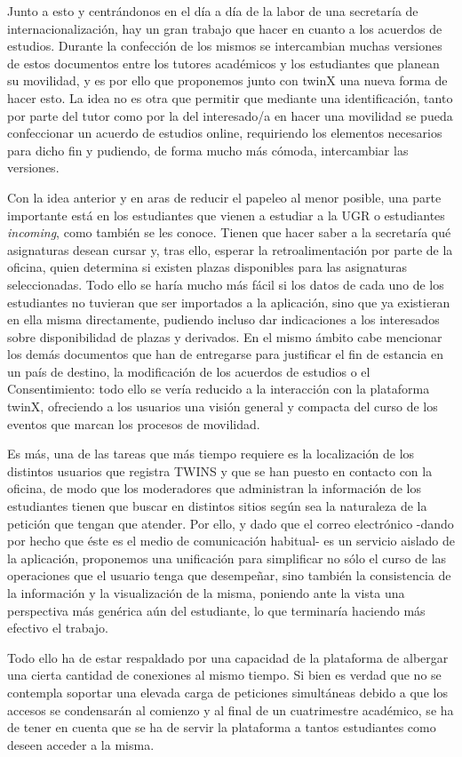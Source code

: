 Junto a esto y centrándonos en el día a día de la labor de una secretaría de internacionalización, hay un gran trabajo que hacer en cuanto a los acuerdos de estudios. Durante la confección de los mismos se intercambian muchas versiones de estos documentos entre los tutores académicos y  los estudiantes que planean su movilidad, y es por ello que proponemos junto con twinX una nueva forma de hacer esto. La idea no es otra que permitir que mediante una identificación, tanto por parte del tutor como por la del interesado/a en hacer una movilidad se pueda confeccionar un acuerdo de estudios online, requiriendo los elementos necesarios para dicho fin y pudiendo, de forma mucho más cómoda, intercambiar las versiones.

Con la idea anterior y en aras de reducir el papeleo al menor posible, una parte importante está en los estudiantes que vienen a estudiar a la UGR o estudiantes \textit{incoming}, como también se les conoce. Tienen que hacer saber a la secretaría qué asignaturas desean cursar y, tras ello, esperar la retroalimentación por parte de la oficina, quien determina si existen plazas disponibles para las asignaturas seleccionadas. Todo ello se haría mucho más fácil si los datos de cada uno de los estudiantes no tuvieran que ser importados a la aplicación, sino que ya existieran en ella misma directamente, pudiendo incluso dar indicaciones a los interesados sobre disponibilidad de plazas y derivados. En el mismo ámbito cabe mencionar los demás documentos que han de entregarse para justificar el fin de estancia en un país de destino, la modificación de los acuerdos de estudios o el \gls{Consentimiento}: todo ello se vería reducido a la interacción con la plataforma twinX, ofreciendo a los usuarios una visión general y compacta del curso de los eventos que marcan los procesos de movilidad.

Es más, una de las tareas que más tiempo requiere es la localización de los distintos usuarios que registra TWINS y que se han puesto en contacto con la oficina, de modo que los moderadores que administran la información de los estudiantes tienen que buscar en distintos sitios según sea la naturaleza de la petición que tengan que atender. Por ello, y dado que el correo electrónico -dando por hecho que éste es el medio de comunicación habitual- es un servicio aislado de la aplicación, proponemos una unificación para simplificar no sólo el curso de las operaciones que el usuario tenga que desempeñar, sino  también la consistencia de la información y la visualización de la misma, poniendo ante la vista una perspectiva más genérica aún del estudiante, lo que terminaría haciendo más efectivo el trabajo.


Todo ello ha de estar respaldado por una capacidad de la plataforma de albergar una cierta cantidad de conexiones al mismo tiempo. Si bien es verdad que no se contempla soportar una elevada carga de peticiones simultáneas debido a que los accesos se condensarán al comienzo y al final de un cuatrimestre académico, se ha de tener en cuenta que se ha de servir la plataforma a tantos estudiantes como deseen acceder a la misma.